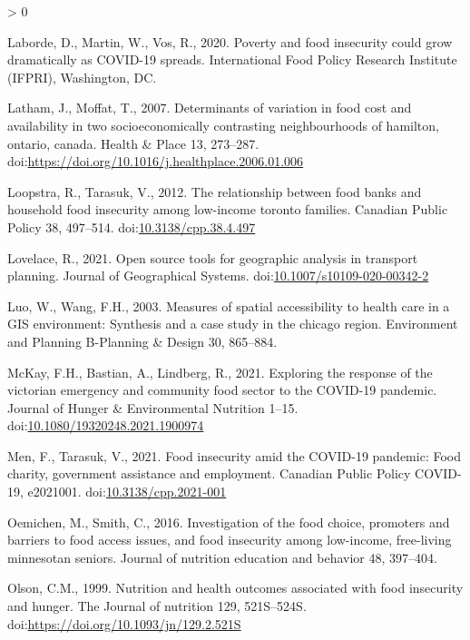 \documentclass[]{elsarticle} %
\newlength{\cslhangindent}
\newenvironment{CSLReferences}[2] %
 {%
  \setlength{\parindent}{0pt}
  \ifodd #1 \everypar{\setlength{\hangindent}{\cslhangindent}}\ignorespaces\fi
  \ifnum #2 > 0
  \setlength{\parskip}{#2\baselineskip}
  \fi
 }%
 {}
\begin{document}
\begin{CSLReferences}{1}{0}
\leavevmode\hypertarget{ref-laborde2020poverty}{}%
Laborde, D., Martin, W., Vos, R., 2020. Poverty and food insecurity
could grow dramatically as COVID-19 spreads. International Food Policy
Research Institute (IFPRI), Washington, DC.

\leavevmode\hypertarget{ref-latham2007determinants}{}%
Latham, J., Moffat, T., 2007. Determinants of variation in food cost and
availability in two socioeconomically contrasting neighbourhoods of
hamilton, ontario, canada. Health \& Place 13, 273--287.
doi:\url{https://doi.org/10.1016/j.healthplace.2006.01.006}

\leavevmode\hypertarget{ref-loopstra2012relationship}{}%
Loopstra, R., Tarasuk, V., 2012. The relationship between food banks and
household food insecurity among low-income toronto families. Canadian
Public Policy 38, 497--514.
doi:\href{https://doi.org/10.3138/cpp.38.4.497}{10.3138/cpp.38.4.497}

\leavevmode\hypertarget{ref-lovelace2021open}{}%
Lovelace, R., 2021. Open source tools for geographic analysis in
transport planning. Journal of Geographical Systems.
doi:\href{https://doi.org/10.1007/s10109-020-00342-2}{10.1007/s10109-020-00342-2}

\leavevmode\hypertarget{ref-luo2003measures}{}%
Luo, W., Wang, F.H., 2003. Measures of spatial accessibility to health
care in a GIS environment: Synthesis and a case study in the chicago
region. Environment and Planning B-Planning \& Design 30, 865--884.

\leavevmode\hypertarget{ref-mckay2021exploring}{}%
McKay, F.H., Bastian, A., Lindberg, R., 2021. Exploring the response of
the victorian emergency and community food sector to the COVID-19
pandemic. Journal of Hunger \& Environmental Nutrition 1--15.
doi:\href{https://doi.org/10.1080/19320248.2021.1900974}{10.1080/19320248.2021.1900974}

\leavevmode\hypertarget{ref-men2021food}{}%
Men, F., Tarasuk, V., 2021. Food insecurity amid the COVID-19 pandemic:
Food charity, government assistance and employment. Canadian Public
Policy COVID-19, e2021001.
doi:\href{https://doi.org/10.3138/cpp.2021-001}{10.3138/cpp.2021-001}

\leavevmode\hypertarget{ref-oemichen2016investigation}{}%
Oemichen, M., Smith, C., 2016. Investigation of the food choice,
promoters and barriers to food access issues, and food insecurity among
low-income, free-living minnesotan seniors. Journal of nutrition
education and behavior 48, 397--404.

\leavevmode\hypertarget{ref-olson1999nutrition}{}%
Olson, C.M., 1999. Nutrition and health outcomes associated with food
insecurity and hunger. The Journal of nutrition 129, 521S--524S.
doi:\url{https://doi.org/10.1093/jn/129.2.521S}


\end{CSLReferences}
\end{document}

